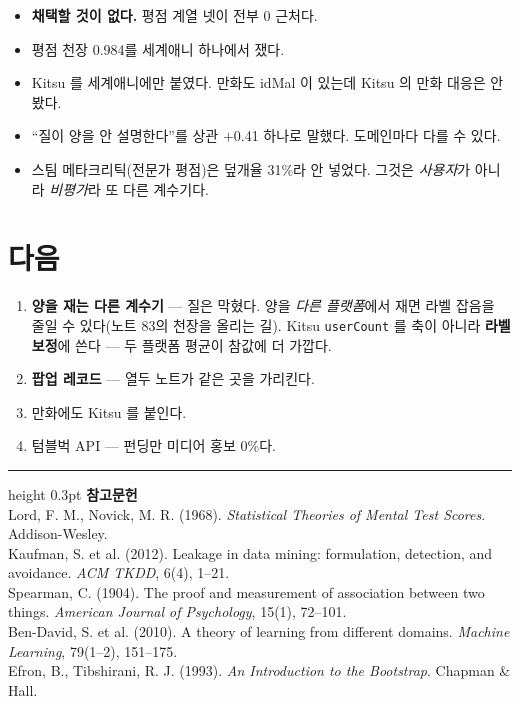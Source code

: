 \documentclass[10pt]{article}
\begin{document}
\begin{itemize}[leftmargin=1.1em,itemsep=0.15em]
\item \textbf{채택할 것이 없다.} 평점 계열 넷이 전부 0 근처다.
\item 평점 천장 0.984를 세계애니 하나에서 쟀다.
\item Kitsu 를 세계애니에만 붙였다. 만화도 idMal 이 있는데 Kitsu 의 만화
      대응은 안 봤다.
\item ``질이 양을 안 설명한다''를 상관 $+$0.41 하나로 말했다. 도메인마다
      다를 수 있다.
\item 스팀 메타크리틱(전문가 평점)은 덮개율 31\%라 안 넣었다. 그것은
      \emph{사용자}가 아니라 \emph{비평가}라 또 다른 계수기다.
\end{itemize}

\section{다음}

\begin{enumerate}[leftmargin=1.3em,itemsep=0.15em]
\item \textbf{양을 재는 다른 계수기} --- 질은 막혔다. 양을 \emph{다른
      플랫폼}에서 재면 라벨 잡음을 줄일 수 있다(노트 83의 천장을 올리는 길).
      Kitsu \texttt{userCount} 를 축이 아니라 \textbf{라벨 보정}에 쓴다 ---
      두 플랫폼 평균이 참값에 더 가깝다.
\item \textbf{팝업 레코드} --- 열두 노트가 같은 곳을 가리킨다.
\item 만화에도 Kitsu 를 붙인다.
\item 텀블벅 API --- 펀딩만 미디어 홍보 0\%다.
\end{enumerate}

\vspace{0.6em}
\hrule height 0.3pt
\vspace{0.5em}
{\footnotesize
\textbf{참고문헌}\\[0.3em]
Lord, F. M., Novick, M. R. (1968). \emph{Statistical Theories of Mental Test
Scores}. Addison-Wesley.\\[0.15em]
Kaufman, S. et al. (2012). Leakage in data mining: formulation, detection, and
avoidance. \emph{ACM TKDD}, 6(4), 1--21.\\[0.15em]
Spearman, C. (1904). The proof and measurement of association between two
things. \emph{American Journal of Psychology}, 15(1), 72--101.\\[0.15em]
Ben-David, S. et al. (2010). A theory of learning from different domains.
\emph{Machine Learning}, 79(1--2), 151--175.\\[0.15em]
Efron, B., Tibshirani, R. J. (1993). \emph{An Introduction to the Bootstrap}.
Chapman \& Hall.
}
\end{document}
